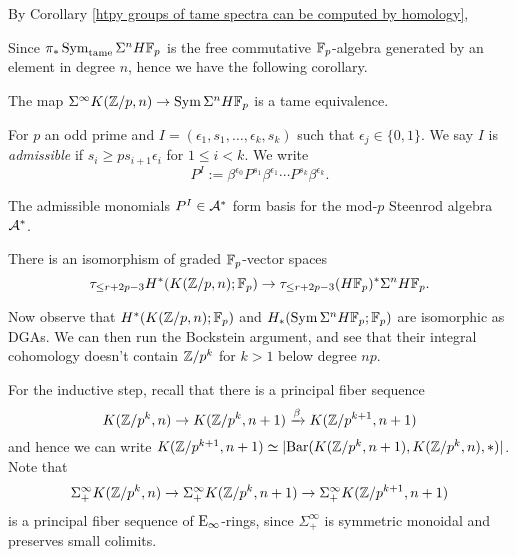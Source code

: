 By Corollary \ref{htpy groups of tame spectra can be computed by homology}, 



Since $\pi_* \operatorname{Sym}_{\operatorname{\operatorname{tame}}} \Sigma^n H{\mathbb{F}}_p$ is the free commutative ${\mathbb{F}}_p$-algebra generated by an element in degree $n$, hence we have the following corollary.
\begin{corollary}
\label{base case}
	The map $\Sigma^{\infty}K({\mathbb{Z}}/p,n) \to 
	\operatorname{Sym} \Sigma^nH{\mathbb{F}}_p$ is a tame equivalence.
\end{corollary}

For $p$ an odd prime and $I=(\epsilon_1, s_1, \dots, \epsilon_k, s_k)$ such that $\epsilon_j\in \{0,1\}$.
We say $I$ is \emph{admissible} if $s_i\geq ps_{i+1}\epsilon_i$ for $1\leq i <k$. We write 
$$
P^I:=\beta^{\epsilon_0}P^{s_1}\beta^{\epsilon_1}\cdots P^{s_k}\beta^{\epsilon_k}.
$$
\begin{theorem}
	[??]
	The admissible monomials $P^I\in {\mathcal{A}}^{*}$ form basis for the mod-$p$ Steenrod algebra ${\mathcal{A}}^*$.
\end{theorem}




\begin{corollary}
	There is an isomorphism of graded ${\mathbb{F}}_p$-vector spaces
	\[
	\tau_{\leq r+2p-3}H^{*}( K({\mathbb{Z}}/p,n);{\mathbb{F}}_p) 
	\to
	\tau_{\leq r+2p-3} (H{\mathbb{F}}_p)^*\Sigma^nH{\mathbb{F}}_p.
	\]
\end{corollary}





Now observe that $H^{*}(K({\mathbb{Z}}/p,n);{\mathbb{F}}_p)$ and $H_{*}(\operatorname{Sym} \Sigma^nH{\mathbb{F}}_p;{\mathbb{F}}_p)$ are isomorphic as DGAs.
We can then run the Bockstein argument, and see that their integral cohomology doesn't contain ${\mathbb{Z}}/p^k$ for $k>1$ below degree $np$.


For the inductive step, recall that there is a principal fiber sequence
\[
K({\mathbb{Z}}/p^k,n)\to 
K({\mathbb{Z}}/p^k,n+1)
\xrightarrow{\beta} K({\mathbb{Z}}/p^{k+1},n+1)
\]
and hence we can write $K({\mathbb{Z}}/p^{k+1},n+1)\simeq \lvert\operatorname{Bar}(K({\mathbb{Z}}/p^k,n+1),K({\mathbb{Z}}/p^k,n),*)\rvert$.
Note that 
\begin{equation}
\label{principal fiber seq for EM-spaces}
	\Sigma^{\infty}_{+}K({\mathbb{Z}}/p^k,n)\to 
\Sigma^{\infty}_{+}K({\mathbb{Z}}/p^k,n+1)
\to 
\Sigma^{\infty}_{+}
K({\mathbb{Z}}/p^{k+1},n+1)
\end{equation}
is a principal fiber sequence of $\operatorname{E}_{\infty}$-rings,
since $\Sigma^{\infty}_{+}$ is symmetric monoidal and preserves small colimits.


